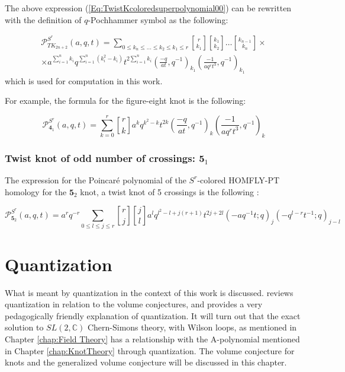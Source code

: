 \documentclass[a4paper,titlepage,twoside]{book}
\begin{document}
The above expression (\ref{Eq:TwistKcoloredsuperpolynomial00}) can be rewritten with the definition of $q$-Pochhammer symbol as the following:

\begin{equation}
\begin{gathered}
\mathcal{P}^{ S^r}_{TK_{2n+2} }{ (a,q,t)} = \sum_{ 0 \leq k_n \leq \dots \leq k_2 \leq k_1 \leq r} { r \brack k_1 } { k_1 \brack k_2 } \dots { k_{n-1} \brack k_n } \times \\
\times a^{ \sum_{i=1}^n k_i } q^{ \sum_{i=1}^n (k_i^2- k_i) } t^{ 2 \sum_{i=1}^n k_i } \left( \frac{-q}{ at} , q^{-1} \right)_{k_1} \left( \frac{-1}{ aq^r t^3 } , q^{-1} \right)_{ k_1} 
\end{gathered} \label{Eq:TwistKcoloredsuperpolynomial01}
\end{equation}
which is used for computation in this work.  

For example, the formula for the figure-eight knot is the following:

\begin{equation}
\mathcal{P}^{S^r}_{\mathbf{4}_1}{ (a,q,t)} = \sum_{k=0}^r { r \brack k }a^k q^{k^2 - k } t^{2k} \left( \frac{-q}{ at}, q^{-1} \right)_k \left( \frac{-1}{ aq^r t^3 }, q^{-1} \right)_k
\end{equation}

\subsection{Twist knot of odd number of crossings: $\mathbf{5}_1$}

The expression for the Poincar\'{e} polynomial of the $S^r$-colored HOMFLY-PT homology for the $\mathbf{5}_2$ knot, a twist knot of 5 crossings is the following \cite{FujiGukovStosicSulkowski2013}:

\begin{equation}
  \mathcal{P}^{S^r}_{\mathbf{5}_2}{ (a,q,t)} = a^r q^{-r} \sum_{ 0 \leq l \leq j \leq r} { r \brack j} { j \brack l } a^l q^{ l^2 - l + j(r+1) } t^{2j + 2l} (-aq^{-1}t;q)_j ( -q^{l-r}t^{-1};q)_{j-l}  \label{Eq:5_2coloredsuperpolynomial00}
\end{equation}

\chapter{Quantization} \label{chap:Quantization}

What is meant by quantization in the context of this work is discussed.  \cite{DimofteGukov2010} reviews quantization in relation to the volume conjectures, and \cite{GukovSaberi2012} provides a very pedagogically friendly explanation of quantization.  It will turn out that the exact solution to $SL{(2,\mathbb{C})}$ Chern-Simons theory, with Wilson loops, as mentioned in Chapter \ref{chap:Field Theory} has a relationship with the A-polynomial mentioned in Chapter \ref{chap:KnotTheory} through quantization.  The volume conjecture for knots and the generalized volume conjecture will be discussed in this chapter.
\end{document}
